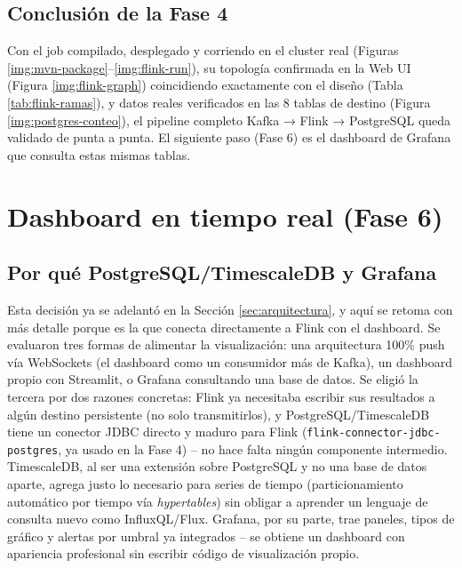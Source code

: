 
\subsection{Conclusión de la Fase 4}

Con el job compilado, desplegado y corriendo en el cluster real (Figuras \ref{img:mvn-package}--\ref{img:flink-run}), su topología confirmada en la Web UI (Figura \ref{img:flink-graph}) coincidiendo exactamente con el diseño (Tabla \ref{tab:flink-ramas}), y datos reales verificados en las 8 tablas de destino (Figura \ref{img:postgres-conteo}), el pipeline completo Kafka → Flink → PostgreSQL queda validado de punta a punta. El siguiente paso (Fase 6) es el dashboard de Grafana que consulta estas mismas tablas.

\clearpage
\section{Dashboard en tiempo real (Fase 6)}
\label{sec:dashboard}

\subsection{Por qué PostgreSQL/TimescaleDB y Grafana}

Esta decisión ya se adelantó en la Sección \ref{sec:arquitectura}, y aquí se retoma con más detalle porque es la que conecta directamente a Flink con el dashboard. Se evaluaron tres formas de alimentar la visualización: una arquitectura 100\% push vía WebSockets (el dashboard como un consumidor más de Kafka), un dashboard propio con Streamlit, o Grafana consultando una base de datos. Se eligió la tercera por dos razones concretas: Flink ya necesitaba escribir sus resultados a algún destino persistente (no solo transmitirlos), y PostgreSQL/TimescaleDB tiene un conector JDBC directo y maduro para Flink (\texttt{flink-connector-jdbc-postgres}, ya usado en la Fase 4) -- no hace falta ningún componente intermedio. TimescaleDB, al ser una extensión sobre PostgreSQL y no una base de datos aparte, agrega justo lo necesario para series de tiempo (particionamiento automático por tiempo vía \textit{hypertables}) sin obligar a aprender un lenguaje de consulta nuevo como InfluxQL/Flux. Grafana, por su parte, trae paneles, tipos de gráfico y alertas por umbral ya integrados -- se obtiene un dashboard con apariencia profesional sin escribir código de visualización propio.

